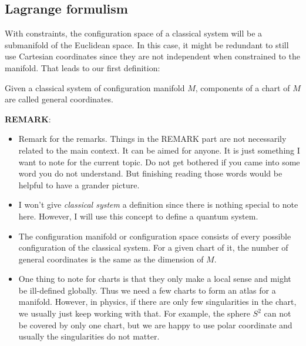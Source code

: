 \subsection{Lagrange formulism}
With constraints, the configuration space of a classical system will be a submanifold of the  Euclidean space. In this case, it might be redundant to still use Cartesian coordinates since they are not independent when constrained to the manifold. That leads to our first definition:

\begin{definition}
    Given a classical system of configuration manifold $M$, components of a chart of $M$ are called general coordinates.
\end{definition}

\textbf{REMARK}:
\begin{itemize}
    \item Remark for the remarks. Things in the REMARK part are not necessarily related to the main context. It can be aimed for anyone. It is just something I want to note for the current topic. Do not get bothered if you came into some word you do not understand. But finishing reading those words would be helpful to have a grander picture.
    \item I won't give \textit{classical system} a definition since there is nothing special to note here. However, I will use this concept to define a quantum system.
    \item The configuration manifold or configuration space consists of every possible configuration of the classical system. For a given chart of it, the number of general coordinates is the same as the dimension of $M$.
    \item One thing to note for charts is that they only make a local sense and might be ill-defined globally. Thus we need a few charts to form an atlas for a manifold. However, in physics, if there are only few singularities in the chart, we usually just keep working with that. For example, the sphere $S^2$ can not be covered by only one chart, but we are happy to use polar coordinate and usually the singularities do not matter.
    
\end{itemize}

